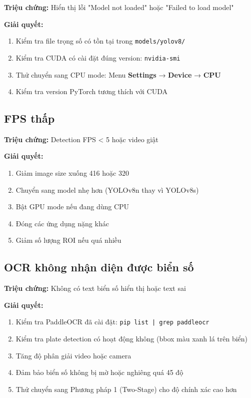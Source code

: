 \textbf{Triệu chứng:} Hiển thị lỗi "Model not loaded" hoặc "Failed to load model"

\textbf{Giải quyết:}
\begin{enumerate}
    \item Kiểm tra file trọng số có tồn tại trong \texttt{models/yolov8/}
    \item Kiểm tra CUDA có cài đặt đúng version: \texttt{nvidia-smi}
    \item Thử chuyển sang CPU mode: Menu \textbf{Settings} → \textbf{Device} → \textbf{CPU}
    \item Kiểm tra version PyTorch tương thích với CUDA
\end{enumerate}

\subsection{FPS thấp}

\textbf{Triệu chứng:} Detection FPS < 5 hoặc video giật

\textbf{Giải quyết:}
\begin{enumerate}
    \item Giảm image size xuống 416 hoặc 320
    \item Chuyển sang model nhẹ hơn (YOLOv8n thay vì YOLOv8s)
    \item Bật GPU mode nếu đang dùng CPU
    \item Đóng các ứng dụng nặng khác
    \item Giảm số lượng ROI nếu quá nhiều
\end{enumerate}

\subsection{OCR không nhận diện được biển số}

\textbf{Triệu chứng:} Không có text biển số hiển thị hoặc text sai

\textbf{Giải quyết:}
\begin{enumerate}
    \item Kiểm tra PaddleOCR đã cài đặt: \texttt{pip list | grep paddleocr}
    \item Kiểm tra plate detection có hoạt động không (bbox màu xanh lá trên biển)
    \item Tăng độ phân giải video hoặc camera
    \item Đảm bảo biển số không bị mờ hoặc nghiêng quá 45 độ
    \item Thử chuyển sang Phương pháp 1 (Two-Stage) cho độ chính xác cao hơn
\end{enumerate}

